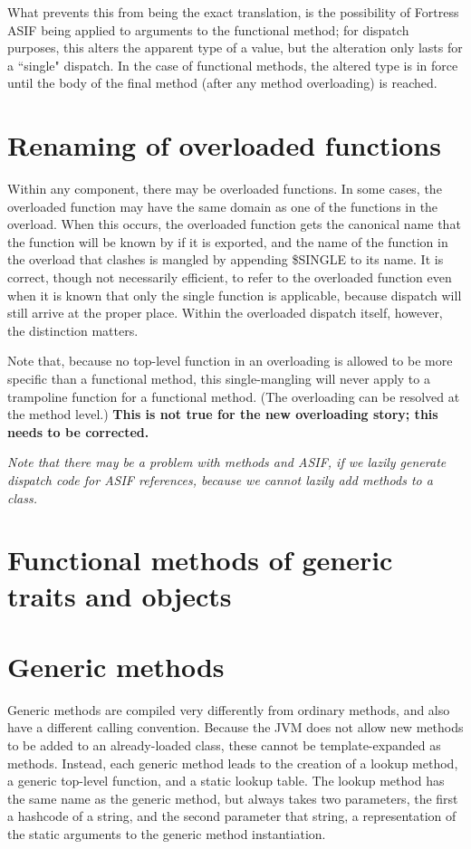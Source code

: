 \documentclass[11pt]{article}
\begin{document}
What prevents this from being the exact translation, is the possibility of Fortress ASIF being applied to arguments to the functional method; for dispatch purposes, this alters the apparent type of a value, but the alteration only lasts for a ``single" dispatch.  In the case of functional methods, the altered type is in force until the body of the final method (after any method overloading) is reached.

\section{Renaming of overloaded functions}

Within any component, there may be overloaded functions.  In some cases, the overloaded function may have the same domain as one of the functions in the overload.  When this occurs, the overloaded function gets the canonical name that the function will be known by if it is exported, and the name of the function in the overload that clashes is mangled by appending \$SINGLE to its name.  It is correct, though not necessarily efficient, to refer to the overloaded function even when it is known that only the single function is applicable, because dispatch will still arrive at the proper place.  Within the overloaded dispatch itself, however, the distinction matters.

Note that, because no top-level function in an overloading is allowed to be more specific than a functional method, this single-mangling will never apply to a trampoline function for a functional method.  (The overloading can be resolved at the method level.)  {\bf
This is not true for the new overloading story; this needs to be corrected.}

{\it Note that there may be a problem with methods and ASIF, if we lazily generate dispatch code for ASIF references, because we cannot lazily add methods to a class. }

\section{Functional methods of generic traits and objects}




\section{Generic methods}

Generic methods are compiled very differently from ordinary methods, and also have a different calling convention.
Because the JVM does not allow new methods to be added to an already-loaded class, these cannot be template-expanded as methods.
Instead, each generic method leads to the creation of a lookup method, a generic top-level function, and a static lookup table.  The lookup method has the same name as the generic method, but always takes two parameters, the first a hashcode of a string, and the second parameter that string, a representation of the static arguments to the generic method instantiation.
\end{document}
